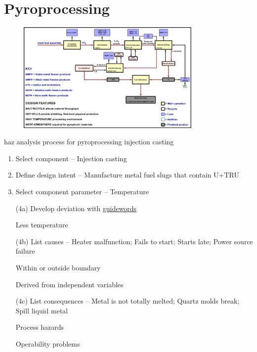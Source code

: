 \documentclass[aspectratio=1610,pdftex,dvipsnames,compress,xcolor={dvipsnames}]{beamer}
\newcommand{\acs}{\acrshort} %
\begin{document}
\section{Pyroprocessing}


\addtocounter{framenumber}{-1}
\begin{frame}{}
    \begin{figure}
        \centering
        \includegraphics[width=0.80\textwidth]{pyroprocessing.flowsheet.jpg}
    \end{figure}
\end{frame}


\begin{frame}{\acs{haz} analysis process for pyroprocessing injection casting}
    \begin{enumerate}[series=outerlist,topsep=0pt,itemsep=1pt,leftmargin=*,label=(\arabic*)]
        \item Select component -- Injection casting
            \vspace{0.05in}
        \item Define design intent -- Manufacture metal fuel slugs that contain U+TRU
            \vspace{0.05in}
        \item Select component parameter -- Temperature
            \vspace{0.05in}
        \item[(4a)] Develop deviation with \href{https://uidaho.pressbooks.pub/riskassessment/chapter/hazop/}{guidewords}
        \item[]Less temperature
            \vspace{0.05in}
        \item[(4b)] List causes -- Heater malfunction; Fails to start; Starts late; Power source failure
        \item[]Within or outside boundary  
        \item[]Derived from independent variables
            \vspace{0.05in}
        \item[(4c)] List consequences -- Metal is not totally melted; Quartz molds break; Spill liquid metal 
        \item[] Process hazards  
        \item[] Operability problems 
    \end{enumerate}
\end{frame}
\end{document}
